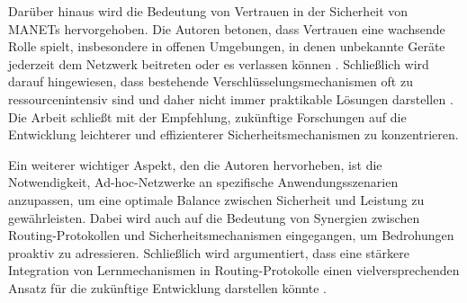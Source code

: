 Darüber hinaus wird die Bedeutung von Vertrauen in der Sicherheit von MANETs hervorgehoben. 
Die Autoren betonen, dass Vertrauen eine wachsende Rolle spielt, insbesondere in offenen Umgebungen, 
in denen unbekannte Geräte jederzeit dem Netzwerk beitreten oder es verlassen können \cite[S. 13]{Li2007}. 
Schließlich wird darauf hingewiesen, dass bestehende Verschlüsselungsmechanismen oft zu ressourcenintensiv 
sind und daher nicht immer praktikable Lösungen darstellen \cite[S. 14]{Li2007}. Die Arbeit schließt mit der 
Empfehlung, zukünftige Forschungen auf die Entwicklung leichterer und effizienterer Sicherheitsmechanismen zu 
konzentrieren. 

Ein weiterer wichtiger Aspekt, den die Autoren hervorheben, ist die Notwendigkeit, Ad-hoc-Netzwerke an spezifische 
Anwendungsszenarien anzupassen, um eine optimale Balance zwischen Sicherheit und Leistung zu gewährleisten. 
Dabei wird auch auf die Bedeutung von Synergien zwischen Routing-Protokollen und Sicherheitsmechanismen eingegangen, 
um Bedrohungen proaktiv zu adressieren. Schließlich wird argumentiert, dass eine stärkere Integration von 
Lernmechanismen in Routing-Protokolle einen vielversprechenden Ansatz für die zukünftige Entwicklung darstellen könnte 
\cite[S. 15]{Li2007}.
